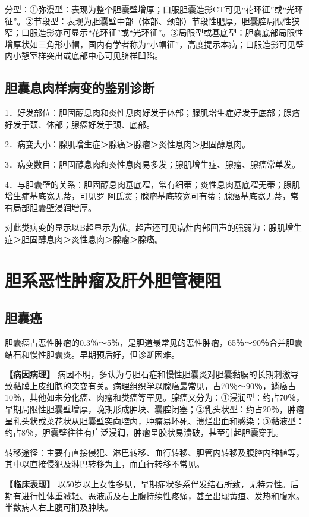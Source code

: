 分型：①弥漫型：表现为整个胆囊壁增厚；口服胆囊造影CT可见“花环征”或“光环征”。②节段型：表现为胆囊壁中部（体部、颈部）节段性肥厚，胆囊腔局限性狭窄；口服造影亦可显示“花环征”或“光环征”。③局限型或基底型：胆囊底部局限性增厚状如三角形小帽，国内有学者称为“小帽征”，高度提示本病；口服造影可见壁内小憩室样突出或底部中心可见脐样凹陷。

\subsection{胆囊息肉样病变的鉴别诊断}

1．好发部位：胆固醇息肉和炎性息肉好发于体部；腺肌增生症好发于底部；腺瘤好发于颈、体部；腺癌好发于颈、底部。

2．病变大小：腺肌增生症＞腺癌＞腺瘤＞炎性息肉＞胆固醇息肉。

3．病变数目：胆固醇息肉和炎性息肉易多发；腺肌增生症、腺瘤、腺癌常单发。

4．与胆囊壁的关系：胆固醇息肉基底窄，常有细蒂；炎性息肉基底窄无蒂；腺肌增生症基底宽无蒂，可见罗-阿氏窦；腺瘤基底较宽可有蒂；腺癌基底宽无蒂，常有局部胆囊壁浸润增厚。

对此类病变的显示以B超显示为优。超声还可见病灶内部回声的强弱为：腺肌增生症＞胆固醇息肉＞炎性息肉＞腺瘤＞腺癌。

\section{胆系恶性肿瘤及肝外胆管梗阻}

\subsection{胆囊癌}

胆囊癌占恶性肿瘤的0.3％～5％，是胆道最常见的恶性肿瘤，65％～90％合并胆囊结石和慢性胆囊炎。早期预后好，但诊断困难。

\textbf{【病因病理】}
病因不明，多认为与胆石症和慢性胆囊炎对胆囊黏膜的长期刺激导致黏膜上皮细胞的突变有关。病理组织学以腺癌最常见，占70％～90％，鳞癌占10％，其他如未分化癌、肉瘤和类癌等罕见。腺癌又分为：①浸润型：约占70％，早期局限性胆囊壁增厚，晚期形成肿块、囊腔闭塞；②乳头状型：约占20％，肿瘤呈乳头状或菜花状从胆囊壁突向腔内，肿瘤易坏死、溃烂出血和感染；③黏液型：约占8％，胆囊壁往往有广泛浸润，肿瘤呈胶状易溃破，甚至引起胆囊穿孔。

转移途径：主要有直接侵犯、淋巴转移、血行转移、胆管内转移及腹腔内种植等，其中以直接侵犯及淋巴转移为主，而血行转移不常见。

\textbf{【临床表现】}
以50岁以上女性多见，早期症状多系伴发结石所致，无特异性。后期有进行性体重减轻、恶液质及右上腹持续性疼痛，甚至出现黄疸、发热和腹水。半数病人右上腹可扪及肿块。

